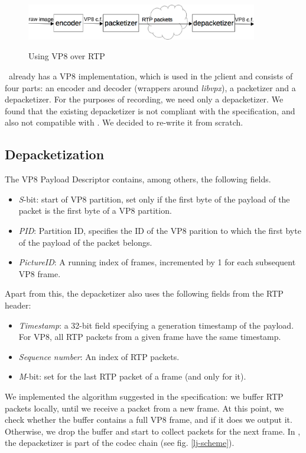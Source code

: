 \documentclass[twoside,openright,a4paper,12pt,english]{article}
\begin{document}
\begin{figure}[h]
    \includegraphics[width=0.9\textwidth]{./pics/vp8.eps}
    \label{vp8-scheme}
    \caption{Using VP8 over RTP}
\end{figure}

\lj\ already has a VP8 implementation, which is used in the \j client and
consists of four parts: an encoder and decoder (wrappers around \emph{libvpx}),
a packetizer and a depacketizer. For the purposes of recording, we need 
only a depacketizer. We found that the existing depacketizer is not compliant with
the specification, and also not compatible with \wrtc. We decided to re-write it from scratch.

\subsection{Depacketization}
\label{depacketizer}
The VP8 Payload Descriptor contains, among others, the following fields.
\begin{itemize}
\item \emph{S}-bit: start of VP8 partition, set only if the first byte of the payload of the packet is the first byte of a VP8 partition.
\item \emph{PID}: Partition ID, specifies the ID of the VP8 parition to which the first byte of the payload of the packet belongs.
\item \emph{PictureID}: A running index of frames, incremented by 1 for each subsequent VP8 frame.
\end{itemize}

Apart from this, the depacketizer also uses the following fields from the RTP header:
\begin{itemize}
\item \emph{Timestamp}: a 32-bit field specifying a generation timestamp of the payload. For VP8, all RTP packets from a given frame have the same timestamp.
\item \emph{Sequence number}: An index of RTP packets.
\item \emph{M}-bit: set for the last RTP packet of a frame (and only for it).
\end{itemize}

We implemented the algorithm suggested in the specification: we buffer RTP
packets locally, until we receive a packet from a new frame. At this point, we
check whether the buffer contains a full VP8 frame, and if it does we output
it. Otherwise, we drop the buffer and start to collect packets for the next
frame. In \lj, the depacketizer is part of the codec chain (see fig. \ref{lj-scheme}).
\end{document}
